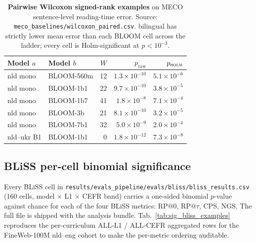 \begin{table}[!ht]
  \centering
  \small
  \caption{\textbf{Pairwise Wilcoxon signed-rank examples} on MECO sentence-level reading-time error. Source: \texttt{meco\_baselines/wilcoxon\_paired.csv}. \beetle{} bilingual has strictly lower mean error than each BLOOM cell across the ladder; every cell is Holm-significant at $p < 10^{-3}$.}
  \label{tab:sig_wilcoxon_examples}
  \begin{tabular}{llrrr}
    \toprule
    Model $a$ & Model $b$ & $W$ & $p_\text{raw}$ & $p_\textsc{holm}$ \\
    \midrule
    \beetle{} nld mono     & BLOOM-560m  & 12 & $1.3{\times}10^{-10}$ & $5.1{\times}10^{-6}$ \\
    \beetle{} nld mono     & BLOOM-1b1   & 22 & $9.7{\times}10^{-10}$ & $3.8{\times}10^{-5}$ \\
    \beetle{} nld mono     & BLOOM-1b7   & 41 & $1.8{\times}10^{-8}$  & $7.1{\times}10^{-4}$ \\
    \beetle{} nld mono     & BLOOM-3b    & 21 & $8.1{\times}10^{-10}$ & $3.2{\times}10^{-5}$ \\
    \beetle{} nld mono     & BLOOM-7b1   & 32 & $5.0{\times}10^{-9}$  & $2.0{\times}10^{-4}$ \\
    \beetle{} nld--ukr B1  & BLOOM-1b1   & 0  & $1.8{\times}10^{-12}$ & $7.3{\times}10^{-8}$ \\
    \bottomrule
  \end{tabular}
\end{table}

\subsection{BLiSS per-cell binomial significance}\label{sec:sig-bliss}

Every BLiSS cell in \texttt{results/evals\_pipeline/evals/bliss/bliss\_results.csv} (160 cells, model $\times$ L1 $\times$ CEFR band) carries a one-sided binomial $p$-value against chance for each of the four BLiSS metrics: RP$@0$, RP$@\tau$, CPS, NGS. The full file is shipped with the analysis bundle. Tab.~\ref{tab:sig_bliss_examples} reproduces the per-curriculum ALL-L1 / ALL-CEFR aggregated rows for the FineWeb-100M nld--eng cohort to make the per-metric ordering auditable.


